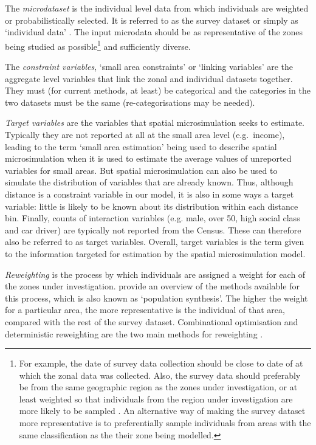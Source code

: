 The \emph{microdataset} is the individual level data from which individuals are
weighted or probabilistically selected. It is referred to as the survey
dataset \citep{Wu2008} or simply as `individual data' \citep{Simpson2005}.
The input microdata should be as representative of the zones being studied as
possible\footnote{For
example, the date of survey data collection should be
close to date of at which the zonal data was collected. Also, the survey data
should preferably be from the same geographic region as the zones under
investigation, or at least weighted so that individuals from the region under
investigation are more likely to be sampled \citep{Ballas2005-ireland}. An alternative
way of making the survey dataset more representative is to preferentially
sample individuals from areas with the same classification as the 
their zone being modelled.
}
and sufficiently diverse. %

The \emph{constraint variables}, `small area constraints' or `linking
variables' are the aggregate level variables that link the zonal and individual
datasets together. They must (for current methods, at least)
be categorical and the categories in the two
datasets must be the same (re-categorisations may be needed).

\emph{Target variables} are the variables that spatial microsimulation seeks
to estimate. Typically they are not reported at all at the small area level
(e.g.~income), leading to the term `small area estimation' being used
to describe spatial microsimulation when it is used to estimate the
average values of unreported variables for small areas. But spatial
microsimulation can also be used to simulate the distribution of variables that
are already known. Thus, although distance is a constraint variable in
our model, it is also in some ways a target variable: 
little is likely to be known about its distribution within each distance bin. 
Finally, counts of interaction
variables (e.g. male, over 50,
high social class and car driver) are typically not reported from the Census.
These can therefore also be referred to as target variables. Overall,
target variables is the term given to the information targeted for
estimation by the spatial microsimulation model.

\emph{Reweighting} is the process by which individuals are assigned a weight
for each of the zones under investigation. \citet{harland2012} provide
an overview of the methods available for this process, which is
also known as `population synthesis'. The higher the weight for a
particular area, the more representative is the individual of that area,
compared with the rest of the survey dataset. Combinational optimisation
and deterministic reweighting 
are the two main methods for reweighting \citep{Hermes2012a}.

